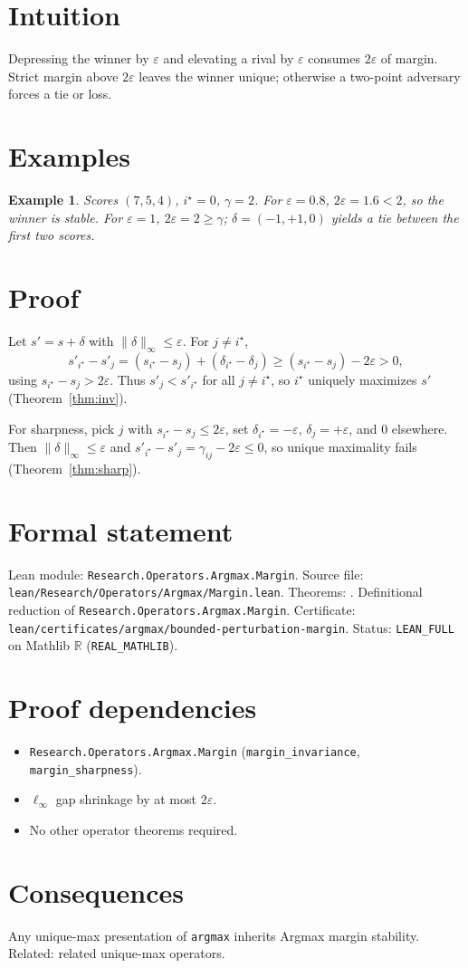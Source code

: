 \documentclass[11pt]{article}
\newtheorem{example}[theorem]{Example}
\begin{document}
\section{Intuition}
Depressing the winner by $\varepsilon$ and elevating a rival by $\varepsilon$ consumes $2\varepsilon$ of margin. Strict margin above $2\varepsilon$ leaves the winner unique; otherwise a two-point adversary forces a tie or loss.

\section{Examples}
\begin{example}
Scores $(7,5,4)$, $i^\star=0$, $\gamma=2$. For $\varepsilon=0.8$, $2\varepsilon=1.6<2$, so the winner is stable. For $\varepsilon=1$, $2\varepsilon=2\ge\gamma$; $\delta=(-1,+1,0)$ yields a tie between the first two scores.
\end{example}

\section{Proof}
Let $s'=s+\delta$ with $\|\delta\|_\infty\le\varepsilon$. For $j\neq i^\star$,
\[
s'_{i^\star}-s'_j
=(s_{i^\star}-s_j)+(\delta_{i^\star}-\delta_j)
\ge (s_{i^\star}-s_j)-2\varepsilon
>0,
\]
using $s_{i^\star}-s_j>2\varepsilon$. Thus $s'_j<s'_{i^\star}$ for all $j\neq i^\star$, so $i^\star$ uniquely maximizes $s'$ (Theorem~\ref{thm:inv}).

For sharpness, pick $j$ with $s_{i^\star}-s_j\le 2\varepsilon$, set $\delta_{i^\star}=-\varepsilon$, $\delta_j=+\varepsilon$, and $0$ elsewhere. Then $\|\delta\|_\infty\le\varepsilon$ and $s'_{i^\star}-s'_j=\gamma_{ij}-2\varepsilon\le 0$, so unique maximality fails (Theorem~\ref{thm:sharp}).

\section{Formal statement}
Lean module: \texttt{Research.Operators.Argmax.Margin}.
Source file: \texttt{lean/Research/Operators/Argmax/Margin.lean}.
Theorems: .
Definitional reduction of \texttt{Research.Operators.Argmax.Margin}.
Certificate: \texttt{lean/certificates/argmax/bounded-perturbation-margin}.
Status: \texttt{LEAN\_FULL} on Mathlib $\mathbb{R}$ (\texttt{REAL\_MATHLIB}).

\section{Proof dependencies}
\begin{itemize}
\item \texttt{Research.Operators.Argmax.Margin} (\texttt{margin\_invariance}, \texttt{margin\_sharpness}).
\item $\ell_\infty$ gap shrinkage by at most $2\varepsilon$.
\item No other operator theorems required.
\end{itemize}

\section{Consequences}
Any unique-max presentation of \texttt{argmax} inherits Argmax margin stability. Related: related unique-max operators.
\end{document}
